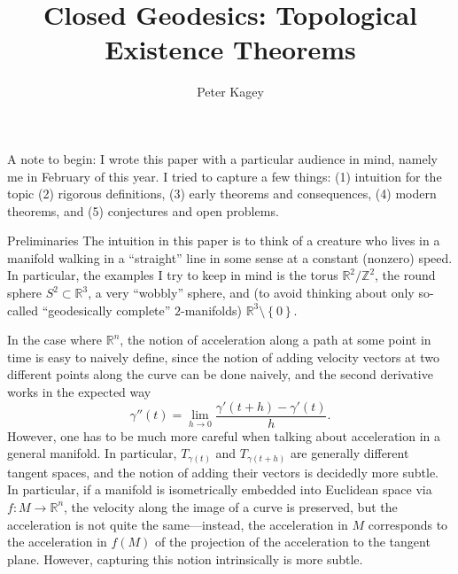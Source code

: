 \documentclass{article}
\newcommand{\fn}[3]{#1 \colon #2 \rightarrow #3}
\newcommand{\set}[1]{\left\{#1\right\}}
\theoremstyle{definition}
\theoremstyle{remark}
\begin{document}
\title{Closed Geodesics: Topological Existence Theorems}
\author{Peter Kagey}

\maketitle

A note to begin: I wrote this paper with a particular audience in mind, namely
me in February of this year. I tried to capture a few things: (1) intuition for
the topic (2) rigorous definitions, (3) early theorems and consequences,
(4) modern theorems, and (5) conjectures and open problems.

\begin{section}{Preliminaries}
  The intuition in this paper is to think of a creature who lives in a manifold
  walking in a ``straight'' line in some sense at a constant
  (nonzero) speed. In particular, the examples I try to keep in mind is the
  torus $\mathbb R^2/\mathbb Z^2$, the round sphere $S^2 \subset \mathbb R^3$,
  a very ``wobbly'' sphere, and
  (to avoid thinking about only so-called ``geodesically complete'' $2$-manifolds)
  $\mathbb R^3 \setminus \set{0}$.

  In the case where $\mathbb R^n$, the notion of acceleration along a path at
  some point in time is easy to naively define, since the notion of adding
  velocity vectors at two different points along the curve can be done naively,
  and the second derivative works in the expected way \[
    \gamma''(t) = \lim_{h \rightarrow 0} \frac{\gamma'(t + h) - \gamma'(t)}{h}.
  \] However, one has to be much more careful when talking about acceleration
  in a general manifold. In particular, $T_{\gamma(t)}$ and $T_{\gamma(t+h)}$ are
  generally different tangent spaces, and the notion of adding their vectors is
  decidedly more subtle. In particular, if a manifold is isometrically embedded
  into Euclidean space via $\fn f M {\mathbb R^n}$, the velocity along the image
  of a curve is preserved, but the acceleration is not quite the same---instead,
  the acceleration in $M$ corresponds to the acceleration in $f(M)$
  of the projection of the acceleration to the tangent plane.
  However, capturing this notion intrinsically is more subtle.



\end{section}
\end{document}
